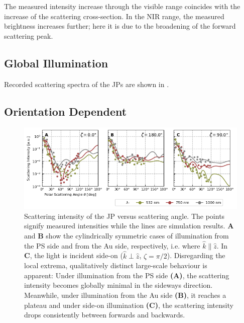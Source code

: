 \documentclass[10pt]{article}
\newcommand{\reffig}[2]{\mbox{\sffamily{Figure \ref{#1}#2}}}
\begin{document}
\begin{multicols}{2}
The measured intensity increase through the visible range coincides with the increase of the scattering cross-section. 
In the NIR range, the measured brightness increases further; here it is due to the broadening of the forward scattering peak. 





\subsection*{Global Illumination}


Recorded scattering spectra of the JPs are shown in \reffig{fig:spectra}{B}.

\subsection*{Orientation Dependent}

\begin{figure}[t!]
    \centering
    \includegraphics[width=\textwidth]{[fig] cartesian mieplots (3, placeholder)}
    \caption{Scattering intensity of the JP versus scattering angle. 
    The points signify measured intensities while the lines are simulation results.  
    {\sffamily\bfseries A} and {\sffamily\bfseries B} show the cylindrically symmetric cases of illumination from the PS side and from the Au side, respectively, i.e. where $\hat{k}\parallel\hat{z}$. 
    In {\sffamily\bfseries C}, the light is incident side-on ($\hat{k}\perp\hat{z}$, $\zeta=\pi/2$). 
    Disregarding the local extrema, qualitatively distinct large-scale behaviour is apparent: Under illumination from the PS side {\sffamily\bfseries (A)}, the scattering intensity becomes globally minimal in the sideways direction. 
    Meanwhile, under illumination from the Au side {\sffamily\bfseries (B)}, it reaches a plateau and under side-on illumination {\sffamily\bfseries (C)}, the scattering intensity drops consistently between forwards and backwards.  
    }
    \label{fig:jp-mieplots-oneline}
\end{figure}




\end{multicols}
\end{document}
